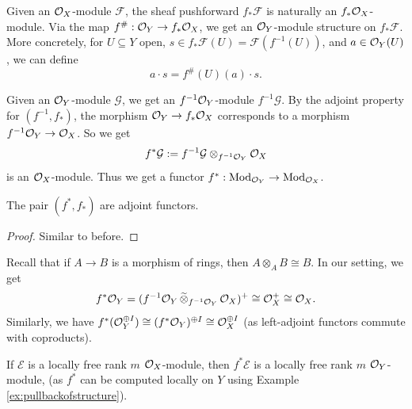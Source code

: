 \begin{remark}[Pushforward]
  Given an $\mathcal{O}_X$-module $\mathcal{F}$,
  the sheaf pushforward
  $f_* \mathcal{F}$
  is naturally an $f_* \mathcal{O}_X$-module.
  Via the map
  $f^\# : \mathcal{O}_Y \to f_* \mathcal{O}_X$,
  we get an $\mathcal{O}_Y$-module structure
  on $f_* \mathcal{F}$.
  More concretely, for
  $U \subseteq Y$ open,
  $s \in f_* \mathcal{F}(U) = \mathcal{F}(f^{-1}(U))$,
  and $a \in \mathcal{O}_Y(U)$, we can define
  \[
    a \cdot s
    = f^\#(U)(a) \cdot s.
  \]
\end{remark}

\begin{remark}[Pullback]
  Given an $\mathcal{O}_Y$-module
  $\mathcal{G}$, we get an
  $f^{-1} \mathcal{O}_Y$-module
  $f^{-1} \mathcal{G}$. By the
  adjoint property for
  $(f^{-1}, f_*)$, the morphism
  $\mathcal{O}_Y \to f_* \mathcal{O}_X$
  corresponds to a morphism
  $f^{-1} \mathcal{O}_Y \to \mathcal{O}_X$. So we get
  \[
    f^* \mathcal{G} := f^{-1} \mathcal{G} \otimes_{f^{-1} \mathcal{O}_Y} \mathcal{O}_X
  \]
  is an $\mathcal{O}_X$-module.
  Thus we get a functor
  $f^* : \mathrm{Mod}_{\mathcal{O}_Y} \to \mathrm{Mod}_{\mathcal{O}_X}$.
\end{remark}

\begin{prop}
  The pair $(f^*, f_*)$ are
  adjoint functors.
\end{prop}

\begin{proof}
  Similar to before.
\end{proof}

\begin{example}\label{ex:pullbackofstructure}
  Recall that if $A \to B$ is a
  morphism of rings, then
  $A \otimes_A B \cong B$. In
  our setting, we get
  \[
    f^* \mathcal{O}_Y
    = (f^{-1} \mathcal{O}_Y\, \widetilde{\otimes}_{f^{-1} \mathcal{O}_Y}\, \mathcal{O}_X)^+
    \cong \mathcal{O}_X^+ \cong \mathcal{O}_X.
  \]
  Similarly, we have
  $f^*(\mathcal{O}_Y^{\oplus I}) \cong (f^* \mathcal{O}_Y)^{\oplus I} \cong \mathcal{O}_X^{\oplus I}$
  (as left-adjoint functors
  commute with coproducts).
\end{example}

\begin{remark}
  If $\mathcal{E}$ is a locally
  free rank $m$ $\mathcal{O}_X$-module,
  then $f^* \mathcal{E}$ is a
  locally free rank $m$ $\mathcal{O}_Y$-module,
  (as $f^*$ can be computed locally
  on $Y$ using Example \ref{ex:pullbackofstructure}).
\end{remark}

